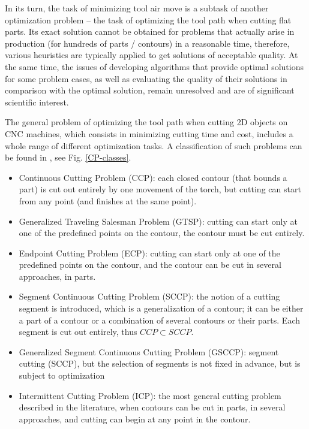 \documentclass[]{llncs}
\begin{document}
In its turn,
the task of minimizing tool air move
is a subtask of another optimization problem --
the task of optimizing the tool path when cutting flat parts.
Its exact solution cannot be obtained for problems
that actually arise in production
(for hundreds of parts / contours) in a reasonable time,
therefore,
various heuristics are typically applied
to get solutions of acceptable quality.
At the same time, the issues of developing algorithms
that provide optimal solutions for some problem cases,
as well as evaluating the quality of their solutions
in comparison with the optimal solution,
remain unresolved and are of significant scientific interest.

The general problem of optimizing the tool path
when cutting 2D objects on CNC machines,
which consists in minimizing cutting time and cost,
includes a whole range of different optimization tasks.
A classification of such problems
can be found
in \cite{bi01,bi02,bi03},
see Fig. \ref{CP-classes}.

\begin{itemize}
  \item
  Continuous Cutting Problem (CCP): each closed contour (that bounds a part)
  is cut out entirely by one movement of the torch,
  but cutting can start from any point (and finishes at the same point).

  \item
  Generalized Traveling Salesman Problem (GTSP):
  cutting can start only at one of the predefined points on the contour,
  the contour must be cut entirely.

  \item
  Endpoint Cutting Problem (ECP):
  cutting can start only at one of the predefined points on the contour,
  and the contour can be cut in several approaches, in parts.

  \item
  Segment Continuous Cutting Problem (SCCP):
  the notion of a cutting segment is introduced,
  which is a generalization of a contour;
  it can be either a part of a contour
  or a combination of several contours or their parts.
  Each segment is cut out entirely, thus
  $ CCP \subset SCCP$.

  \item
  Generalized Segment Continuous Cutting Problem (GSCCP):
  segment cutting (SCCP),
  but the selection of segments is not fixed in advance,
  but is subject to optimization

  \item
  Intermittent Cutting Problem (ICP):
  the most general cutting problem described in the literature,
  when contours can be cut in parts,
  in several approaches,
  and cutting can begin at any point in the contour.
\end{itemize}
\end{document}
